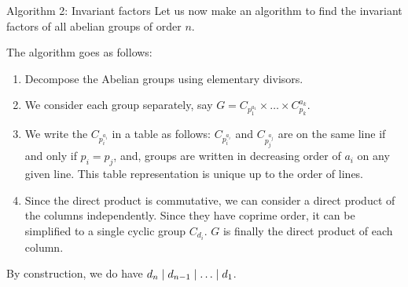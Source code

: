 \documentclass[a4paper]{article}
\begin{document}
\begin{parag}{Algorithm 2: Invariant factors}
    Let us now make an algorithm to find the invariant factors of all abelian groups of order $n$.

    The algorithm goes as follows:
    \begin{enumerate}
        \item Decompose the Abelian groups using elementary divisors.
        \item We consider each group separately, say $G = C_{p_1^{a_1}} \times \ldots \times C_{p_k}^{a_k}$.
        \item We write the $C_{p_i^{a_i}}$ in a table as follows: $C_{p_i^{a_i}}$ and $C_{p_j^{a_j}}$ are on the same line if and only if $p_i = p_j$, and, groups are written in decreasing order of $a_i$ on any given line. This table representation is unique up to the order of lines.
        \item Since the direct product is commutative, we can consider a direct product of the columns independently. Since they have coprime order, it can be simplified to a single cyclic group $C_{d_i}$. $G$ is finally the direct product of each column.
    \end{enumerate}
    
    By construction, we do have $d_n \mid d_{n-1} \mid \ldots \mid d_1$.
\end{parag}
\end{document}
